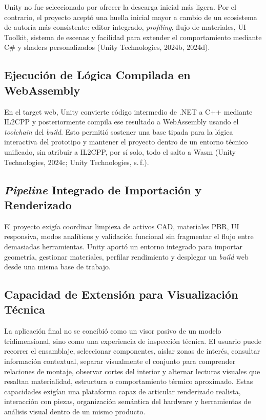 Unity no fue seleccionado por ofrecer la descarga inicial más ligera. Por el contrario, el proyecto aceptó una huella inicial mayor a cambio de un ecosistema de autoría más consistente: editor integrado, \textit{profiling}, flujo de materiales, UI Toolkit, sistema de escenas y facilidad para extender el comportamiento mediante C\# y shaders personalizados (Unity Technologies, 2024b, 2024d).

\subsection*{Ejecución de Lógica Compilada en WebAssembly}

En el target web, Unity convierte código intermedio de .NET a C++ mediante IL2CPP y posteriormente compila ese resultado a WebAssembly usando el \textit{toolchain} del \textit{build}. Esto permitió sostener una base tipada para la lógica interactiva del prototipo y mantener el proyecto dentro de un entorno técnico unificado, sin atribuir a IL2CPP, por sí solo, todo el salto a Wasm (Unity Technologies, 2024c; Unity Technologies, s.\,f.).

\subsection*{\textit{Pipeline} Integrado de Importación y Renderizado}

El proyecto exigía coordinar limpieza de activos CAD, materiales PBR, UI responsiva, modos analíticos y validación funcional sin fragmentar el flujo entre demasiadas herramientas. Unity aportó un entorno integrado para importar geometría, gestionar materiales, perfilar rendimiento y desplegar un \textit{build} web desde una misma base de trabajo.

\subsection*{Capacidad de Extensión para Visualización Técnica}

La aplicación final no se concibió como un visor pasivo de un modelo tridimensional, sino como una experiencia de inspección técnica. El usuario puede recorrer el ensamblaje, seleccionar componentes, aislar zonas de interés, consultar información contextual, separar visualmente el conjunto para comprender relaciones de montaje, observar cortes del interior y alternar lecturas visuales que resaltan materialidad, estructura o comportamiento térmico aproximado. Estas capacidades exigían una plataforma capaz de articular renderizado realista, interacción con piezas, organización semántica del hardware y herramientas de análisis visual dentro de un mismo producto.

